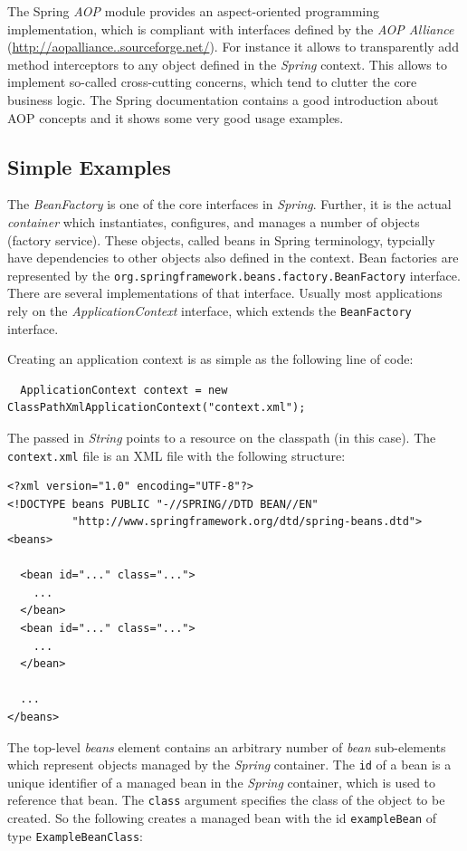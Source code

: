 The Spring \emph{AOP} module provides an aspect-oriented programming 
implementation, which is compliant with interfaces defined by the 
\emph{AOP Alliance} 
(\href{http://aopalliance.sourceforge.net/}{http://aopalliance.\-.sourceforge\-.net/}). 
For instance it allows to transparently add method
interceptors to any object defined in the \emph{Spring} context. This allows
to implement so-called cross-cutting concerns, which tend to clutter the
core business logic. The Spring documentation contains a good introduction
about AOP concepts and it shows some very good usage examples.


\subsection{Simple Examples}

The \emph{BeanFactory} is one of the core interfaces in \emph{Spring}. 
Further, it is the actual \emph{container} which instantiates, configures, and 
manages a number of objects (factory service). 
These objects, called beans in Spring terminology, typcially have
dependencies to other objects also defined in the context. Bean factories
are represented by the \texttt{org.springframework.beans.factory.BeanFactory}
interface. There are several implementations of that interface. 
Usually most applications rely on the \emph{ApplicationContext} interface, which
extends the \texttt{BeanFactory} interface. 

Creating an application context is as simple as the following line of code:
\small{\begin{verbatim}
  ApplicationContext context = new ClassPathXmlApplicationContext("context.xml");
\end{verbatim}}

The passed in \emph{String} points to a resource on the classpath (in this 
case). The \texttt{context.xml} file is an XML file with the following
structure:

\small{\begin{verbatim}
<?xml version="1.0" encoding="UTF-8"?>
<!DOCTYPE beans PUBLIC "-//SPRING//DTD BEAN//EN" 
          "http://www.springframework.org/dtd/spring-beans.dtd">
<beans>
  
  <bean id="..." class="...">
    ...
  </bean>
  <bean id="..." class="...">
    ...
  </bean>

  ...
</beans>
\end{verbatim}}

The top-level \emph{beans} element contains an arbitrary number of \emph{bean}
sub-elements which represent objects managed by the \emph{Spring} container.
The \texttt{id} of a bean is a unique identifier of a managed bean in the 
\emph{Spring} container, which is used to reference that bean. 
The \texttt{class} argument specifies the class
of the object to be created. So the following creates a managed bean
with the id \texttt{exampleBean} of type \texttt{ExampleBeanClass}:

